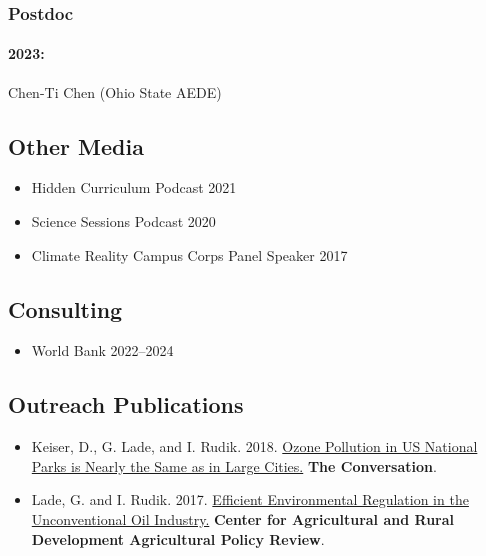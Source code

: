 \documentclass[12pt]{res} %
\begin{document}
\begin{resume}
\vspace{-.2in}

\subsubsection{Postdoc}\vspace{-.2in}
\paragraph{2023:} Chen-Ti Chen (Ohio State AEDE)

\vspace{-.2in}

\subsection{Other Media}

\begin{itemize} \itemsep -1pt
	\item[] Hidden Curriculum Podcast \hfill 2021
	\item[] Science Sessions Podcast \hfill 2020
	\item[] Climate Reality Campus Corps Panel Speaker \hfill 2017
\end{itemize}

\vspace{-.2in}

\subsection{Consulting}

\begin{itemize} %
	\item[] World Bank \hfill 2022--2024
\end{itemize}

\vspace{-.2in}

\subsection{Outreach Publications}

\begin{itemize} %
	\item[] Keiser, D., G. Lade, and I. Rudik. 2018. \href{https://theconversation.com/ozone-pollution-in-us-national-parks-is-nearly-the-same-as-in-large-cities-100148}{Ozone Pollution in US National Parks is Nearly the Same as in Large Cities.} \textbf{The Conversation}.
	\item[] Lade, G. and I. Rudik. 2017. \href{https://www.card.iastate.edu/ag_policy_review/display.aspx?id=70}{Efficient Environmental Regulation in the Unconventional Oil Industry.} \textbf{Center for Agricultural and Rural Development Agricultural Policy Review}.
\end{itemize}


\end{resume}
\end{document}
